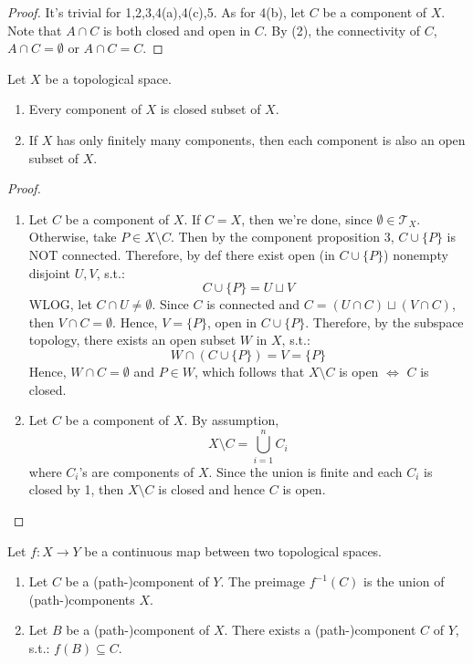 \begin{proof}
    It's trivial for 1,2,3,4(a),4(c),5. As for 4(b), let $C$ be a component of $X$. Note that $A \cap C$ is both closed and open in $C$. By (2), the connectivity of $C$, $A \cap C = \emptyset$ or $A \cap C = C$.
\end{proof}

\begin{proposition}
    Let $X$ be a topological space.
    \begin{enumerate}
        \item Every component of $X$ is closed subset of $X$.
        \item If $X$ has only finitely many components, then each component is also an open subset of $X$.
    \end{enumerate}
\end{proposition}

\begin{proof}
    \begin{enumerate}
        \item Let $C$ be a component of $X$. If $C=X$, then we're done, since $\emptyset \in \mathcal{T}_X$. Otherwise, take $P \in X \setminus C$. Then by the component proposition 3, $C \cup \{P\}$ is NOT connected. Therefore, by def there exist open (in $C\cup \{P\}$) nonempty disjoint $U,V$, s.t.:
        $$C \cup \{P\} = U \sqcup V$$
        WLOG, let $C \cap U \neq \emptyset$. Since $C$ is connected and $C= (U \cap C) \sqcup (V \cap C)$, then $V \cap C = \emptyset$. Hence, $V=\{P\}$, open in $C \cup \{P\}$. Therefore, by the subspace topology, there exists an open subset $W$ in $X$, s.t.:
        $$W \cap (C \cup \{P\}) = V = \{P\}$$
        Hence, $W\cap C = \emptyset$ and $P \in W$, which follows that $X \setminus C$ is open $\Leftrightarrow$ $C$ is closed.

        \item Let $C$ be a component of $X$. By assumption, $$X \setminus C = \bigcup_{i=1}^n C_i$$
        where $C_i$'s are components of $X$. Since the union is finite and each $C_i$ is closed by 1, then $X \setminus C$ is closed and hence $C$ is open.
    \end{enumerate}
\end{proof}

\begin{proposition}
    Let $f: X \to Y$ be a continuous map between two topological spaces.
    \begin{enumerate}
        \item Let $C$ be a (path-)component of $Y$. The preimage $f^{-1} (C)$ is the union of (path-)components $X$.
        \item Let $B$ be a (path-)component of $X$. There exists a (path-)component $C$ of $Y$, s.t.: $f (B) \subseteq C$.
    \end{enumerate}
\end{proposition}

